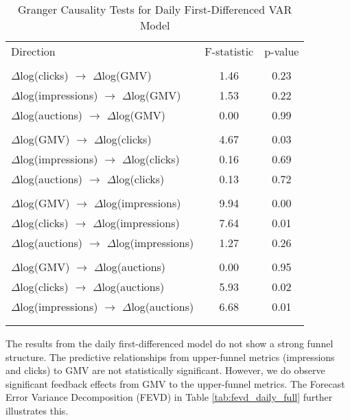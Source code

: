 \begin{table}[htbp!]
\centering
\caption{Granger Causality Tests for Daily First-Differenced VAR Model}
\label{tab:granger_causality_daily_full}
\begin{tabular}{lcc}
\toprule
Direction & F-statistic & p-value \\
\\\midrule
$\Delta$log(clicks) $\rightarrow$ $\Delta$log(GMV) & 1.46 & 0.23 \\
$\Delta$log(impressions) $\rightarrow$ $\Delta$log(GMV) & 1.53 & 0.22 \\
$\Delta$log(auctions) $\rightarrow$ $\Delta$log(GMV) & 0.00 & 0.99 \\
\\\midrule
$\Delta$log(GMV) $\rightarrow$ $\Delta$log(clicks) & 4.67 & 0.03 \\
$\Delta$log(impressions) $\rightarrow$ $\Delta$log(clicks) & 0.16 & 0.69 \\
$\Delta$log(auctions) $\rightarrow$ $\Delta$log(clicks) & 0.13 & 0.72 \\
\\\midrule
$\Delta$log(GMV) $\rightarrow$ $\Delta$log(impressions) & 9.94 & 0.00 \\
$\Delta$log(clicks) $\rightarrow$ $\Delta$log(impressions) & 7.64 & 0.01 \\
$\Delta$log(auctions) $\rightarrow$ $\Delta$log(impressions) & 1.27 & 0.26 \\
\\\midrule
$\Delta$log(GMV) $\rightarrow$ $\Delta$log(auctions) & 0.00 & 0.95 \\
$\Delta$log(clicks) $\rightarrow$ $\Delta$log(auctions) & 5.93 & 0.02 \\
$\Delta$log(impressions) $\rightarrow$ $\Delta$log(auctions) & 6.68 & 0.01 \\\\
\\\bottomrule
\end{tabular}
\end{table}

The results from the daily first-differenced model do not show a strong funnel structure. The predictive relationships from upper-funnel metrics (impressions and clicks) to GMV are not statistically significant. However, we do observe significant feedback effects from GMV to the upper-funnel metrics. The Forecast Error Variance Decomposition (FEVD) in Table \ref{tab:fevd_daily_full} further illustrates this.

